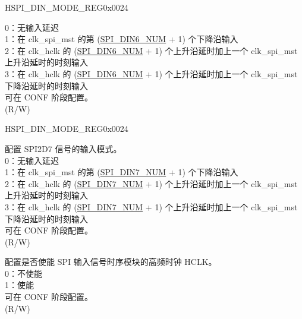 \begin{register}{H}{SPI\_DIN\_MODE\_REG}{0x0024}
\begin{regdesc}
\begin{reglist}
0：无输入延迟\\
1：在 clk\_spi\_mst 的第 (\hyperref[fielddesc:SPIDIN6NUM]{SPI\_DIN6\_NUM} + 1) 个下降沿输入\\
2：在 clk\_hclk 的 (\hyperref[fielddesc:SPIDIN6NUM]{SPI\_DIN6\_NUM} + 1) 个上升沿延时加上一个 clk\_spi\_mst 上升沿延时的时刻输入\\
3：在 clk\_hclk 的 (\hyperref[fielddesc:SPIDIN6NUM]{SPI\_DIN6\_NUM} + 1) 个上升沿延时加上一个 clk\_spi\_mst 下降沿延时的时刻输入\\
可在 CONF 阶段配置。\\
(R/W)
\item [见下页]
\end{reglist}\end{regdesc}
\end{register}

\addtocounter{Regfloat}{-1}
\begin{register}{H}{SPI\_DIN\_MODE\_REG}{0x0024}
\begin{regdesc}\begin{reglist}
\item [接上页]
\label{fielddesc:SPIDIN7MODE}\item [SPI\_DIN7\_MODE] 配置 SPI2D7 信号的输入模式。\\
0：无输入延迟\\
1：在 clk\_spi\_mst 的第 (\hyperref[fielddesc:SPIDIN7NUM]{SPI\_DIN7\_NUM} + 1) 个下降沿输入\\
2：在 clk\_hclk 的 (\hyperref[fielddesc:SPIDIN7NUM]{SPI\_DIN7\_NUM} + 1) 个上升沿延时加上一个 clk\_spi\_mst 上升沿延时的时刻输入\\
3：在 clk\_hclk 的 (\hyperref[fielddesc:SPIDIN7NUM]{SPI\_DIN7\_NUM} + 1) 个上升沿延时加上一个 clk\_spi\_mst 下降沿延时的时刻输入\\
可在 CONF 阶段配置。\\
(R/W)
\label{fielddesc:SPITIMINGHCLKACTIVE}\item [SPI\_TIMING\_HCLK\_ACTIVE] 配置是否使能 SPI 输入信号时序模块的高频时钟 HCLK。\\
0：不使能\\
1：使能\\
可在 CONF 阶段配置。\\
(R/W)
\end{reglist}\end{regdesc}
\end{register}


